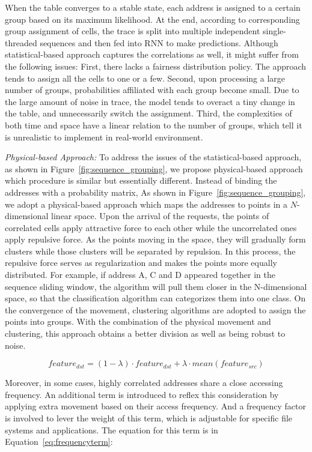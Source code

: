 When the table converges to a stable state, each address is assigned to a certain group based on its maximum likelihood.
At the end, according to corresponding group assignment of cells,
the trace is split into multiple independent single-threaded sequences
and then fed into RNN to make predictions.
Although statistical-based approach captures the correlations as well,
it might suffer from the following issues:
First, there lacks a fairness distribution policy.
The approach tends to assign all the cells to one or a few.
Second, upon processing a large number of groups,
probabilities affiliated with each group become small.
Due to the large amount of noise in trace,
the model tends to overact a tiny change in the table,
and unnecessarily switch the assignment.
Third, the complexities of both time and space have a linear relation
to the number of groups, which tell it is unrealistic to implement
in real-world environment.

\emph{Physical-based Approach:}
To address the issues of the statistical-based approach, as shown in Figure~\ref{fig:sequence_grouping},
we propose physical-based approach which procedure is similar but essentially different.
Instead of binding the addresses with a probability matrix,
As shown in Figure~\ref{fig:sequence_grouping}, we adopt a physical-based approach which
maps the addresses to points in a $N$-dimensional linear space.
Upon the arrival of the requests, the points of correlated cells apply attractive force to each other while the uncorrelated ones apply repulsive force.
As the points moving in the space, they will gradually form clusters while those clusters will be separated by repulsion.
In this process, the repulsive force serves as regularization and makes the points more equally distributed.
For example, if address A, C and D appeared together in the sequence sliding window,
the algorithm will pull them closer in the N-dimensional space,
so that the classification algorithm can categorizes them into one class.
On the convergence of the movement, clustering algorithms are adopted to assign the points into groups.
With the combination of the physical movement and clustering, this approach obtains a better division as well as being robust to noise.

\begin{equation}
\label{eq:physicalbasedequation}
feature_{dst} = (1 - \lambda) \cdot feature_{dst} + \lambda \cdot mean(feature_{src})
\end{equation}

Moreover, in some cases, highly correlated addresses share a close accessing frequency.
An additional term is introduced to reflex this consideration by applying extra movement based on their access frequency.
And a frequency factor is involved to lever the weight of this term, which is adjustable for specific file systems and applications.
The equation for this term is in Equation~\ref{eq:frequencyterm}:

